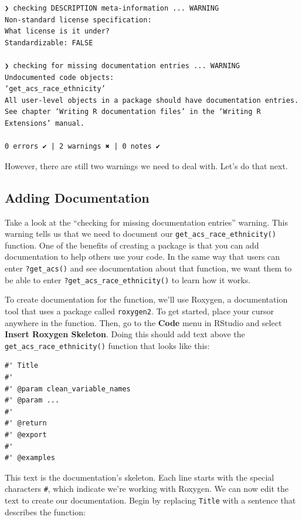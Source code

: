 \documentclass[
]{book}
\begin{document}
\begin{verbatim}
❯ checking DESCRIPTION meta-information ... WARNING
Non-standard license specification:
What license is it under?
Standardizable: FALSE

❯ checking for missing documentation entries ... WARNING
Undocumented code objects:
‘get_acs_race_ethnicity’
All user-level objects in a package should have documentation entries.
See chapter ‘Writing R documentation files’ in the ‘Writing R
Extensions’ manual.

0 errors ✔ | 2 warnings ✖ | 0 notes ✔
\end{verbatim}

However, there are still two warnings we need to deal with. Let's do that next.

\hypertarget{adding-documentation}{%
\subsection*{Adding Documentation}\label{adding-documentation}}

Take a look at the ``checking for missing documentation entries'' warning. This warning tells us that we need to document our \texttt{get\_acs\_race\_ethnicity()} function. One of the benefits of creating a package is that you can add documentation to help others use your code. In the same way that users can enter \texttt{?get\_acs()} and see documentation about that function, we want them to be able to enter \texttt{?get\_acs\_race\_ethnicity()} to learn how it works.

To create documentation for the function, we'll use Roxygen, a documentation tool that uses a package called \texttt{roxygen2}. To get started, place your cursor anywhere in the function. Then, go to the \textbf{Code} menu in RStudio and select \textbf{Insert Roxygen Skeleton}. Doing this should add text above the \texttt{get\_acs\_race\_ethnicity()} function that looks like this:

\begin{verbatim}
#' Title
#'
#' @param clean_variable_names 
#' @param ... 
#'
#' @return
#' @export
#'
#' @examples
\end{verbatim}

This text is the documentation's skeleton. Each line starts with the special characters \texttt{\#\textquotesingle{}}, which indicate we're working with Roxygen. We can now edit the text to create our documentation. Begin by replacing \texttt{Title} with a sentence that describes the function:
\end{document}
